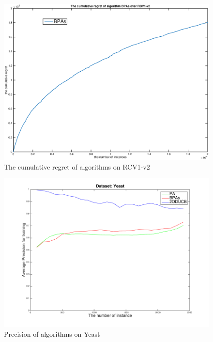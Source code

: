 \begin{figure}[h]
\vspace{.2in}
\centerline{
\includegraphics[scale = 0.6]{fig05/ml/regret.eps}}
\caption{The cumulative regret of algorithms on RCV1-v2}
\label{pig:regret}
\end{figure}

\begin{figure}[h!]
\vspace{.2in}
\centerline{
\includegraphics[scale = 0.6]{fig05/ml/Precision_Yeast.png}}
\caption{Precision of algorithms on Yeast}
\label{pig:PY}
\end{figure}

